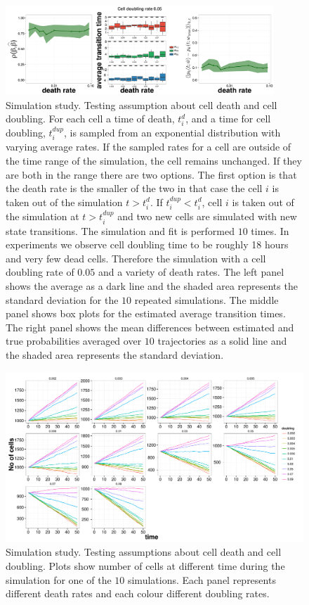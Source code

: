 \begin{figure}
  \centering
  \includegraphics[width=0.9\textwidth]{pics/realist-dupl.pdf}
  \caption{Simulation study. Testing assumption about cell death and cell doubling. For each cell a time of death, $t_i^{d}$, and a time for cell doubling, $t_i^{dup}$, is sampled from an exponential distribution with varying average rates. If the sampled rates for a cell are outside of the time range of the simulation, the cell remains unchanged. If they are both in the range there are two options. The first option is that the death rate is the smaller of the two in that case the cell $i$ is taken out of the simulation $t>t_i^d$. If $t_i^{dup}<t_i^d$, cell $i$ is taken out of the simulation at $t > t_i^{dup}$ and two new cells are simulated with new state transitions. The simulation and fit is performed $10$ times. In experiments we observe cell doubling time to be roughly 18 hours and very few dead cells. Therefore the simulation with a cell doubling rate of $0.05$ and a variety of death rates. The left panel shows the average as a dark line and the shaded area represents the standard deviation for the $10$ repeated simulations. The middle panel shows box plots for the estimated average transition times. The right panel shows the mean differences between estimated and true probabilities averaged over $10$ trajectories as a solid line and the shaded area represents the standard deviation.}
  \label{fig:dupl-realistic}
\end{figure}

\begin{figure}
    \centering \includegraphics[width=1\textwidth]{pics/n-cell.pdf}
    \caption{Simulation study. Testing assumptions about cell death and cell doubling. Plots show number of cells at different time during the simulation for one of the $10$ simulations. Each panel represents different death rates and each colour different doubling rates.}
\label{fig:no-cells-dupl}
\end{figure}

